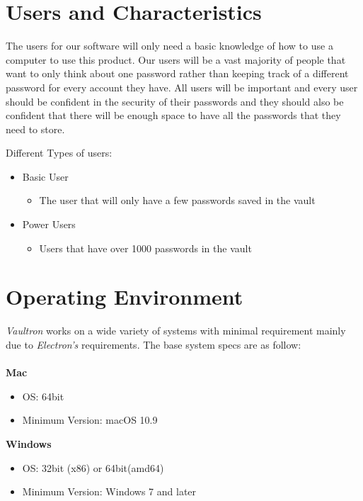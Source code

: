 \documentclass[11pt]{report}
\newenvironment{myitemize}
{ \begin{itemize}
    \setlength{\itemsep}{0pt}
    \setlength{\parskip}{0pt}
    \setlength{\parsep}{0pt}     }
{ \end{itemize}                  }
\begin{document}
\section{Users and Characteristics}
The users for our software will only need a basic knowledge of how to use 
a computer to use this product. Our users will be a vast majority of people 
that want to only think about one password rather than keeping track of a 
different password for every account they have. All users will be important 
and every user should be confident in the security of their passwords and 
they should also be confident that there will be enough space to have all 
the passwords that they need to store.

Different Types of users:
\begin{myitemize}
    \item Basic User
        \begin{myitemize}
            \item The user that will only have a few passwords saved in the vault
        \end{myitemize}
    \item Power Users
        \begin{myitemize}
            \item Users that have over 1000 passwords in the vault
        \end{myitemize}
\end{myitemize}


\section{Operating Environment}
\textit{Vaultron} works on a wide variety of systems with minimal requirement 
mainly due to \textit{Electron's} requirements. The base system specs are as follow:
\\ \\ 
\textbf{Mac}
\begin{myitemize}
    \item OS: 64bit
    \item Minimum Version: macOS 10.9
\end{myitemize}

\textbf{Windows}
\begin{myitemize}
    \item OS: 32bit (x86) or 64bit(amd64)
    \item Minimum Version: Windows 7 and later
\end{myitemize}
\end{document}
